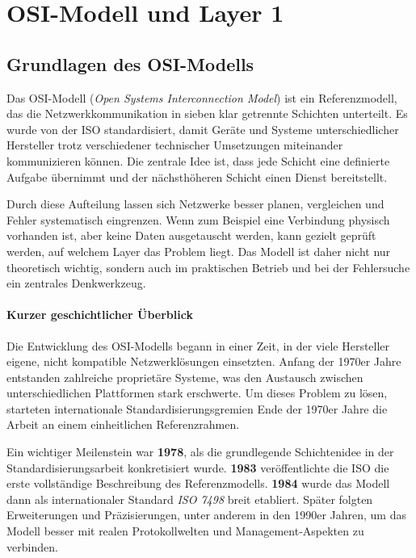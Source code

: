 \documentclass[11pt, oneside, numbers=nönddot]{scrbook}
\begin{document}

\cleardoublepage
{}
\tableofcontents
\clearpage
{}

\chapter{OSI-Modell und Layer 1}
\section{Grundlagen des OSI-Modells}
Das OSI-Modell (\textit{Open Systems Interconnection Model}) ist ein Referenzmodell, das die Netzwerkkommunikation in sieben klar getrennte Schichten unterteilt. Es wurde von der ISO standardisiert, damit Geräte und Systeme unterschiedlicher Hersteller trotz verschiedener technischer Umsetzungen miteinander kommunizieren können. Die zentrale Idee ist, dass jede Schicht eine definierte Aufgabe übernimmt und der nächsthöheren Schicht einen Dienst bereitstellt.

Durch diese Aufteilung lassen sich Netzwerke besser planen, vergleichen und Fehler systematisch eingrenzen. Wenn zum Beispiel eine Verbindung physisch vorhanden ist, aber keine Daten ausgetauscht werden, kann gezielt geprüft werden, auf welchem Layer das Problem liegt. Das Modell ist daher nicht nur theoretisch wichtig, sondern auch im praktischen Betrieb und bei der Fehlersuche ein zentrales Denkwerkzeug.

\subsubsection*{Kurzer geschichtlicher Überblick}
Die Entwicklung des OSI-Modells begann in einer Zeit, in der viele Hersteller eigene, nicht kompatible Netzwerklösungen einsetzten. Anfang der 1970er Jahre entstanden zahlreiche proprietäre Systeme, was den Austausch zwischen unterschiedlichen Plattformen stark erschwerte. Um dieses Problem zu lösen, starteten internationale Standardisierungsgremien Ende der 1970er Jahre die Arbeit an einem einheitlichen Referenzrahmen.

Ein wichtiger Meilenstein war \textbf{1978}, als die grundlegende Schichtenidee in der Standardisierungsarbeit konkretisiert wurde. \textbf{1983} veröffentlichte die ISO die erste vollständige Beschreibung des Referenzmodells. \textbf{1984} wurde das Modell dann als internationaler Standard \textit{ISO 7498} breit etabliert. Später folgten Erweiterungen und Präzisierungen, unter anderem in den 1990er Jahren, um das Modell besser mit realen Protokollwelten und Management-Aspekten zu verbinden.
\end{document}
